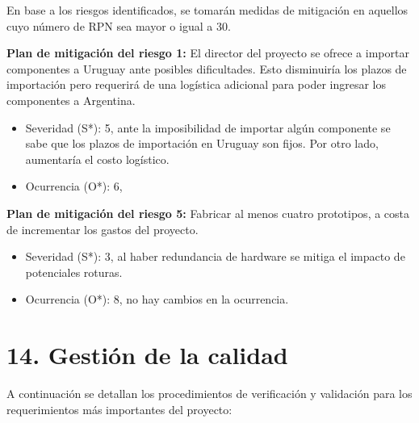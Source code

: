 \documentclass[
11pt, %
]{charter}
\begin{document}
En base a los riesgos identificados, se tomarán medidas de mitigación en aquellos cuyo número de RPN sea mayor o igual a 30.

\textbf{Plan de mitigación del riesgo 1:} El director del proyecto se ofrece a importar componentes a Uruguay ante posibles dificultades. Esto disminuiría los plazos de importación pero requerirá de una logística adicional para poder ingresar los componentes a Argentina. 
\begin{itemize}
	\item Severidad (S*): 5, ante la imposibilidad de importar algún componente se sabe que los plazos de importación en Uruguay son fijos. Por otro lado, aumentaría el costo logístico.
	\item Ocurrencia (O*): 6, 
\end{itemize}

\textbf{Plan de mitigación del riesgo 5:} Fabricar al menos cuatro prototipos, a costa de incrementar los gastos del proyecto.
\begin{itemize}
	\item Severidad (S*): 3, al haber redundancia de hardware se mitiga el impacto de potenciales roturas.
	\item Ocurrencia (O*): 8, no hay cambios en la ocurrencia.
\end{itemize}

\section{14. Gestión de la calidad}
\label{sec:calidad}

A continuación se detallan los procedimientos de verificación y validación para los requerimientos más importantes del proyecto:
\end{document}
